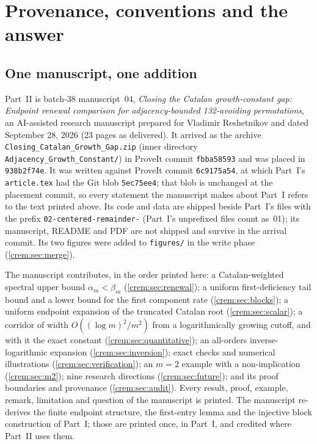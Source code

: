 \documentclass[11pt,a4paper]{article}
\theoremstyle{definition}\newaliascnt{definition}{theorem}
\theoremstyle{remark}\newaliascnt{remark}{theorem}
\begin{document}
\section{Provenance, conventions and the answer}
\label{crem:sec:intro}

\subsection{One manuscript, one addition}
\label{crem:sec:source}
Part~II is batch-38 manuscript~04, \emph{Closing the Catalan growth-constant
gap: Endpoint renewal comparison for adjacency-bounded 132-avoiding
permutations}, an AI-assisted research manuscript prepared for Vladimir
Reshetnikov and dated September 28, 2026 (23 pages as delivered). It arrived
as the archive \texttt{Closing\_Catalan\_Growth\_Gap.zip} (inner directory
\texttt{Adjacency\_Growth\_Constant/}) in ProveIt commit \texttt{fbba58593}
and was placed in \texttt{938b2f74e}. It was written against ProveIt commit
\texttt{6c9175a54}, at which Part~I's \texttt{article.tex} had the Git blob
\texttt{5ec75ee4}; that blob is unchanged at the placement commit, so every
statement the manuscript makes about Part~I refers to the text printed above.
Its code and data are shipped beside Part~I's files with the prefix
\texttt{02-centered-remainder-} (Part~I's unprefixed files count as~01); its
manuscript, README and PDF are not shipped and survive in the arrival commit.
Its two figures were added to \texttt{figures/} in the write phase
(\cref{crem:sec:merge}).

The manuscript contributes, in the order printed here: a Catalan-weighted
spectral upper bound $\alpha_m<\beta_m$ (\cref{crem:sec:renewal}); a uniform
first-deficiency tail bound and a lower bound for the first component rate
(\cref{crem:sec:blocks}); a uniform endpoint expansion of the truncated
Catalan root (\cref{crem:sec:scalar}); a corridor of width
$O((\log m)^2/m^2)$ from a logarithmically growing cutoff, and with it the
exact constant (\cref{crem:sec:quantitative}); an all-orders
inverse-logarithmic expansion (\cref{crem:sec:inversion}); exact checks and
numerical illustrations (\cref{crem:sec:verification}); an $m=2$ example with a
non-implication (\cref{crem:sec:m2}); nine research directions
(\cref{crem:sec:future}); and its proof boundaries and provenance
(\cref{crem:sec:audit}). Every result, proof, example, remark, limitation and
question of the manuscript is printed. The manuscript re-derives the finite
endpoint structure, the first-entry lemma and the injective block
construction of Part~I; those are printed once, in Part~I, and credited
where Part~II uses them.
\end{document}
